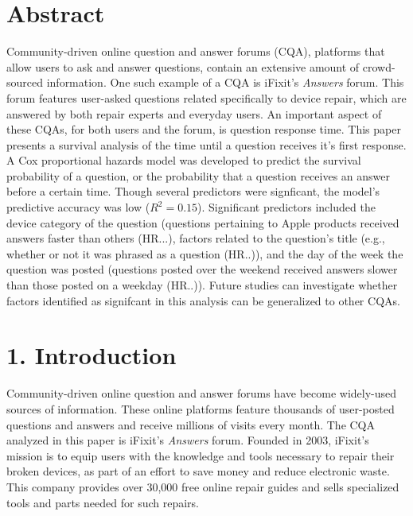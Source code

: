 \documentclass{article}
\begin{document}


\makeatletter
\DeclareRobustCommand\bfseries{%
  \not@math@alphabet\bfseries\mathbf
  \fontseries\bfdefault\selectfont
  \boldmath %
}
\makeatother



\section*{Abstract} %

Community-driven online question and answer forums (CQA), platforms that allow users to ask and answer questions, contain an extensive amount of crowd-sourced information. One such example of a CQA is iFixit's \textit{Answers} forum. This forum features user-asked questions related specifically to device repair, which are answered by both repair experts and everyday users. An important aspect of these CQAs, for both users and the forum, is question response time. This paper presents a survival analysis of the time until a question receives it's first response. A Cox proportional hazards model was developed to predict the survival probability of a question, or the probability that a question receives an answer before a certain time. Though several predictors were signficant, the model's predictive accuracy was low ($R^2 = 0.15$). Significant predictors included the device category of the question (questions pertaining to Apple products received answers faster than others (HR...), factors related to the question's title (e.g., whether or not it was phrased as a question (HR..)), and the day of the week the question was posted (questions posted over the weekend received answers slower than those posted on a weekday (HR..)). Future studies can investigate whether factors identified as signifcant in this analysis can be generalized to other CQAs. 


\section*{1. Introduction}

Community-driven online question and answer forums have become widely-used sources of information. These online platforms feature thousands of user-posted questions and answers and receive millions of visits every month. The CQA analyzed in this paper is iFixit's \textit{Answers} forum. Founded in 2003, iFixit's mission is to equip users with the knowledge and tools necessary to repair their broken devices, as part of an effort to save money and reduce electronic waste. This company provides over 30,000 free online repair guides and sells specialized tools and parts needed for such repairs.
    
\end{document}
